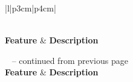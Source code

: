 \begin{longtable}{|l|p{3cm}|p{4cm}|}
    \caption{Property Features}                                                                                         \\
    \hline
    \textbf{Feature} & \textbf{Description}                                                                             \\
    \hline
    \endfirsthead

    {{\tablename\ \thetable{} -- continued from previous page}}                                                         \\
    \hline
    \textbf{Feature} & \textbf{Description}                                                                             \\
    \hline
    \endhead

    \hline {}                                                                 \\ \hline
    \endfoot

    \hline
    \endlastfoot
    \hline


\end{longtable}
